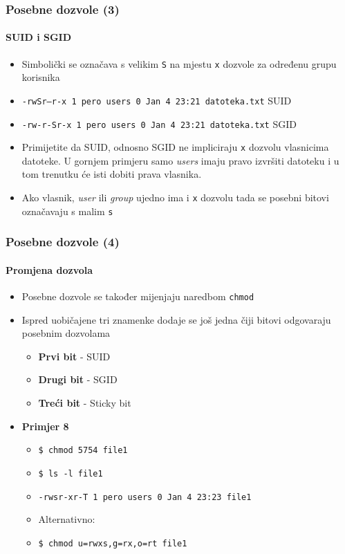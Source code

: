 \documentclass[table,usenames,dvipsnames] {beamer}
\newcommand{\shell}[1]{\texttt{#1}}
\begin{document}
\begin{frame}[t]
  \frametitle{Posebne dozvole (3)}
  \framesubtitle{SUID i SGID}
\begin{itemize}
  \item Simbolički se označava s velikim \shell{S} na mjestu \shell{x} dozvole za određenu grupu korisnika
  \item[] {\footnotesize \shell{-rwSr--r-x 1 pero users 0 Jan  4 23:21 datoteka.txt} \hfill SUID }
  \item[] {\footnotesize \shell{-rw-r-Sr-x 1 pero users 0 Jan  4 23:21 datoteka.txt} \hfill SGID }
\end{itemize}
\begin{itemize}
  \item Primijetite da SUID, odnosno SGID ne impliciraju \shell{x} dozvolu vlasnicima datoteke. U gornjem primjeru samo \textit{users} imaju pravo izvršiti datoteku i u tom trenutku će isti dobiti prava vlasnika.
  \item Ako vlasnik, \textit{user} ili \textit{group} ujedno ima i \shell{x} dozvolu tada se posebni bitovi označavaju s malim \shell{s}
\end{itemize}
\end{frame}

\begin{frame}
  \frametitle{Posebne dozvole (4)}
  \framesubtitle{Promjena dozvola}
\begin{itemize}
  \item Posebne dozvole se također mijenjaju naredbom \shell{chmod}
  \item Ispred uobičajene tri znamenke dodaje se još jedna čiji bitovi odgovaraju posebnim dozvolama
  \begin{itemize}
    \item \textbf{Prvi bit} - SUID
    \item \textbf{Drugi bit} - SGID
    \item \textbf{Treći bit} - Sticky bit
  \end{itemize}
\end{itemize}
\begin{itemize}
  \item \textbf{Primjer 8}
  \begin{itemize}
    \item[] \shell{\$ chmod 5754 file1}
    \item[] \shell{\$ ls -l file1}
    \item[] \shell{-rwsr-xr-T 1 pero users 0 Jan  4 23:23 file1}
    \item \vspace{1em} Alternativno:
    \item[] \shell{\$ chmod u=rwxs,g=rx,o=rt file1}
  \end{itemize}
\end{itemize}
\end{frame}
\end{document}
